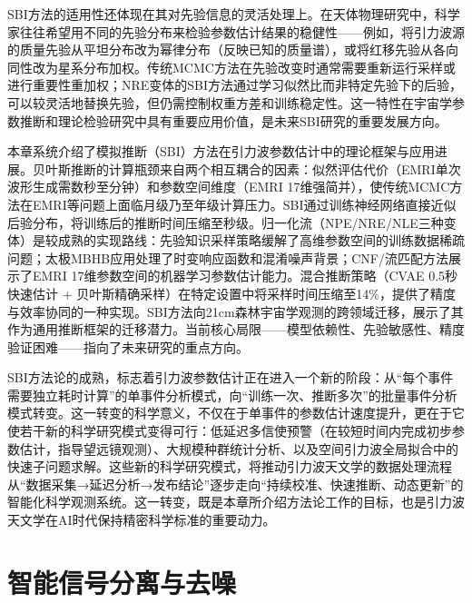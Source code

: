 SBI方法的适用性还体现在其对先验信息的灵活处理上。在天体物理研究中，科学家往往希望用不同的先验分布来检验参数估计结果的稳健性——例如，将引力波源的质量先验从平坦分布改为幂律分布（反映已知的质量谱），或将红移先验从各向同性改为星系分布加权。传统MCMC方法在先验改变时通常需要重新运行采样或进行重要性重加权；NRE变体的SBI方法通过学习似然比而非特定先验下的后验，可以较灵活地替换先验，但仍需控制权重方差和训练稳定性。这一特性在宇宙学参数推断和理论检验研究中具有重要应用价值，是未来SBI研究的重要发展方向。

本章系统介绍了模拟推断（SBI）方法在引力波参数估计中的理论框架与应用进展。贝叶斯推断的计算瓶颈来自两个相互耦合的因素：似然评估代价（EMRI单次波形生成需数秒至分钟）和参数空间维度（EMRI 17维强简并），使传统MCMC方法在EMRI等问题上面临月级乃至年级计算压力。SBI通过训练神经网络直接近似后验分布，将训练后的推断时间压缩至秒级。归一化流（NPE/NRE/NLE三种变体）是较成熟的实现路线：先验知识采样策略缓解了高维参数空间的训练数据稀疏问题；太极MBHB应用处理了时变响应函数和混淆噪声背景；CNF/流匹配方法展示了EMRI 17维参数空间的机器学习参数估计能力。混合推断策略（CVAE 0.5秒快速估计 + 贝叶斯精确采样）在特定设置中将采样时间压缩至14\%，提供了精度与效率协同的一种实现。SBI方法向21cm森林宇宙学观测的跨领域迁移，展示了其作为通用推断框架的迁移潜力。当前核心局限——模型依赖性、先验敏感性、精度验证困难——指向了未来研究的重点方向。

SBI方法论的成熟，标志着引力波参数估计正在进入一个新的阶段：从“每个事件需要独立耗时计算”的单事件分析模式，向“训练一次、推断多次”的批量事件分析模式转变。这一转变的科学意义，不仅在于单事件的参数估计速度提升，更在于它使若干新的科学研究模式变得可行：低延迟多信使预警（在较短时间内完成初步参数估计，指导望远镜观测）、大规模种群统计分析、以及空间引力波全局拟合中的快速子问题求解。这些新的科学研究模式，将推动引力波天文学的数据处理流程从“数据采集→延迟分析→发布结论”逐步走向“持续校准、快速推断、动态更新”的智能化科学观测系统。这一转变，既是本章所介绍方法论工作的目标，也是引力波天文学在AI时代保持精密科学标准的重要动力。

\clearpage

\chapter{智能信号分离与去噪}



